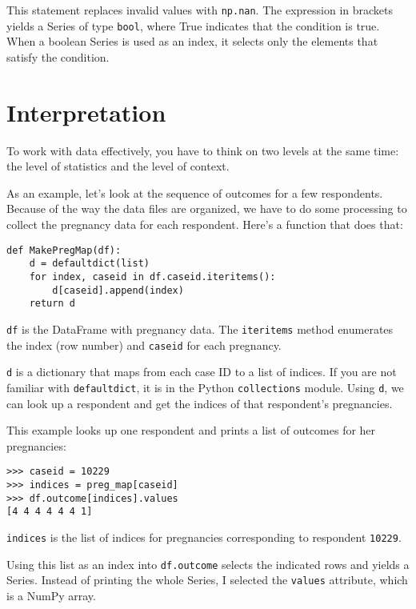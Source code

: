 This statement replaces invalid values with {\tt np.nan}.
The expression in brackets yields a Series of type {\tt bool}, 
where True indicates that the condition is true.  When a boolean
Series is used as an index, it selects only the elements that
satisfy the condition.


\section{Interpretation}

To work with data effectively, you have to think on two levels at the
same time: the level of statistics and the level of context.

As an example, let's look at the sequence of outcomes for a few
respondents.  Because of the way the data files are organized, we have
to do some processing to collect the pregnancy data for each respondent.
Here's a function that does that:

\begin{verbatim}
def MakePregMap(df):
    d = defaultdict(list)
    for index, caseid in df.caseid.iteritems():
        d[caseid].append(index)
    return d
\end{verbatim}

{\tt df} is the DataFrame with pregnancy data.  The {\tt iteritems}
method enumerates the index (row number)
and {\tt caseid} for each pregnancy.

{\tt d} is a dictionary that maps from each case ID to a list of
indices.  If you are not familiar with {\tt defaultdict}, it is in
the Python {\tt collections} module.
Using {\tt d}, we can look up a respondent and get the
indices of that respondent's pregnancies.

This example looks up one respondent and prints a list of outcomes
for her pregnancies:

\begin{verbatim}
>>> caseid = 10229
>>> indices = preg_map[caseid]
>>> df.outcome[indices].values
[4 4 4 4 4 4 1]
\end{verbatim}

{\tt indices} is the list of indices for pregnancies corresponding
to respondent {\tt 10229}.

Using this list as an index into {\tt df.outcome} selects the
indicated rows and yields a Series.  Instead of printing the
whole Series, I selected the {\tt values} attribute, which is
a NumPy array.  

